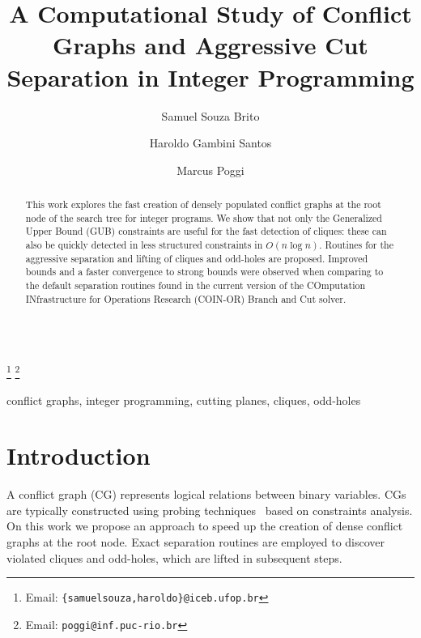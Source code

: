 \documentclass{endm}
\begin{document}
  

\begin{verbatim}\end{verbatim}\vspace{2.5cm}

\begin{frontmatter}

\title{A Computational Study of Conflict Graphs and Aggressive Cut Separation in Integer Programming}
\author{Samuel Souza Brito \and Haroldo Gambini Santos}
\address{{\small Dep. de Computação, Universidade Federal de Ouro Preto - UFOP}}
\author{Marcus Poggi}
\address{{\small Dep. de Informática, Pontifícia Universidade Católica do Rio de Janeiro}}
\thanks[mailSamuelHaroldo]{Email: {\texttt{\normalshape \{samuelsouza,haroldo\}@iceb.ufop.br}}} 
\thanks[mailPoggi]{Email: {\texttt{\normalshape poggi@inf.puc-rio.br}}}  

\begin{abstract}
This work explores the fast creation of densely populated conflict graphs at the root node of the search tree for integer programs. We show that not only the Generalized Upper Bound (GUB) constraints are useful for the fast detection of cliques: these can also be quickly detected in less structured constraints in $O( n \log n )$. Routines for the aggressive separation and lifting of cliques and odd-holes are proposed. Improved bounds and a faster convergence to strong bounds were observed when comparing to the default separation routines found in the current version of the COmputation INfrastructure for Operations Research (COIN-OR) Branch and Cut solver.
\end{abstract}

\begin{keyword}
conflict graphs, integer programming, cutting planes, cliques, odd-holes
\end{keyword}

\end{frontmatter}


\section{Introduction}\label{intro}

A conflict graph (CG) represents logical relations between binary variables. CGs are typically constructed using probing techniques~\cite{Borndorfer1998} based on constraints analysis. On this work we propose an approach to speed up the creation of dense conflict graphs at the root node. Exact separation routines are employed to discover violated cliques and odd-holes, which are lifted in subsequent steps.
\end{document}
